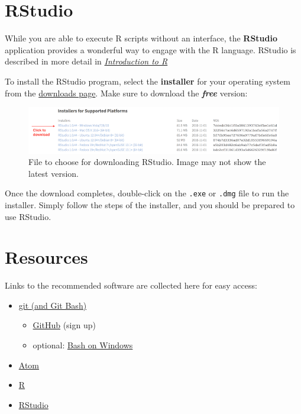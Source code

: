 \documentclass[]{book}
\providecommand{\tightlist}{%
  \setlength{\itemsep}{0pt}\setlength{\parskip}{0pt}}
\theoremstyle{definition}
\theoremstyle{definition}
\theoremstyle{remark}
\begin{document}
\section{RStudio}\label{rstudio}

While you are able to execute R scripts without an interface, the
\textbf{RStudio} application provides a wonderful way to engage with the
R language. RStudio is described in more detail in
\emph{\protect\hyperlink{r-intro}{Introduction to R}}

To install the RStudio program, select the \textbf{installer} for your
operating system from the
\href{https://www.rstudio.com/products/rstudio/download/}{downloads
page}. Make sure to download the \textbf{\emph{free}} version:

\begin{figure}
\centering
\includegraphics{img/setup/rstudio-download.png}
\caption{File to choose for downloading RStudio. Image may not show the
latest version.}
\end{figure}

Once the download completes, double-click on the \texttt{.exe} or
\texttt{.dmg} file to run the installer. Simply follow the steps of the
installer, and you should be prepared to use RStudio.

\hypertarget{resources}{\section*{Resources}\label{resources}}


Links to the recommended software are collected here for easy access:

\begin{itemize}
\tightlist
\item
  \href{https://git-scm.com/downloads}{git (and Git Bash)}

  \begin{itemize}
  \tightlist
  \item
    \href{https://github.com/join}{GitHub} (sign up)
  \item
    optional:
    \href{https://msdn.microsoft.com/en-us/commandline/wsl/install_guide}{Bash
    on Windows}
  \end{itemize}
\item
  \href{https://atom.io/}{Atom}
\item
  \href{https://cran.rstudio.com/}{R}
\item
  \href{https://www.rstudio.com/products/rstudio/download3/}{RStudio}
\end{itemize}
\end{document}
